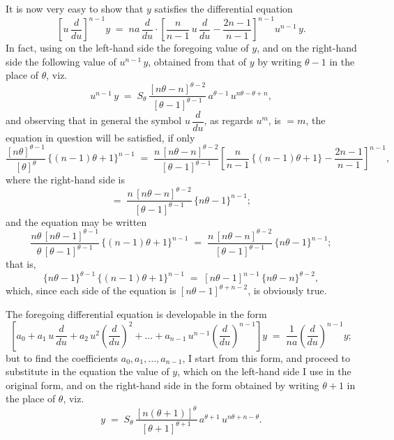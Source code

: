 \documentclass[11pt]{article}
\begin{document}
It is now very easy to show that $y$ satisfies the differential
equation
\[
\left[u\,\frac{d}{du}\right]^{n-1} y
\;=\; n a\, \frac{d}{du}\cdot
\left[\frac{n}{n-1}\, u\,\frac{d}{du} - \frac{2n-1}{n-1}\right]^{n-1}
u^{n-1}\, y.
\]
In fact, using on the left-hand side the foregoing value of $y$, and
on the right-hand side the following value of $u^{n-1}\,y$, obtained
from that of $y$ by writing $\theta-1$ in the place of $\theta$, viz.
\[
u^{n-1}\, y \;=\; S_{\theta}\,
\frac{[n\theta - n]^{\theta-2}}{[\theta-1]^{\theta-1}}\,
a^{\theta-1}\, u^{n\theta-\theta+n},
\]
and observing that in general the symbol $u\,\dfrac{d}{du}$, as
regards $u^{m}$, is $=m$, the equation in question will be satisfied,
if only
\[
\frac{[n\theta]^{\theta-1}}{[\theta]^{\theta}}\,\{(n-1)\theta + 1\}^{n-1}
\;=\;
\frac{n\,[n\theta - n]^{\theta-2}}{[\theta-1]^{\theta-1}}
\left[\frac{n}{n-1}\,\{(n-1)\theta+1\} - \frac{2n-1}{n-1}\right]^{n-1},
\]
where the right-hand side is
\[
=\; \frac{n\,[n\theta - n]^{\theta-2}}{[\theta-1]^{\theta-1}}\,\{n\theta - 1\}^{n-1};
\]
and the equation may be written
\[
\frac{n\theta\,[n\theta - 1]^{\theta-1}}{\theta\,[\theta - 1]^{\theta-1}}\,
\{(n-1)\theta + 1\}^{n-1}
\;=\;
\frac{n\,[n\theta - n]^{\theta-2}}{[\theta - 1]^{\theta-1}}\,
\{n\theta - 1\}^{n-1};
\]
that is,
\[
\{n\theta - 1\}^{\theta - 1}\,\{(n-1)\theta + 1\}^{n-1}
\;=\;
[n\theta - 1]^{n-1}\,\{n\theta - n\}^{\theta-2},
\]
which, since each side of the equation is $[n\theta-1]^{\theta+n-2}$,
is obviously true.

The foregoing differential equation is developable in the form
\[
\left[a_{0} + a_{1}\, u\,\frac{d}{du}
        + a_{2}\, u^{2}\!\left(\frac{d}{du}\right)^{\!2}
        + \ldots + a_{n-1}\, u^{n-1}\!\left(\frac{d}{du}\right)^{\!n-1}\right] y
\;=\; \frac{1}{n a}\left(\frac{d}{du}\right)^{\!n-1} y;
\]
but to find the coefficients $a_{0}, a_{1}, \ldots, a_{n-1}$, I start
from this form, and proceed to substitute in the equation the value of
$y$, which on the left-hand side I use in the original form, and on
the right-hand side in the form obtained by writing $\theta + 1$ in
the place of $\theta$, viz.
\[
y \;=\; S_{\theta}\, \frac{[n(\theta+1)]^{\theta}}{[\theta+1]^{\theta+1}}\,
a^{\theta+1}\, u^{n\theta + n - \theta}.
\]
\end{document}
